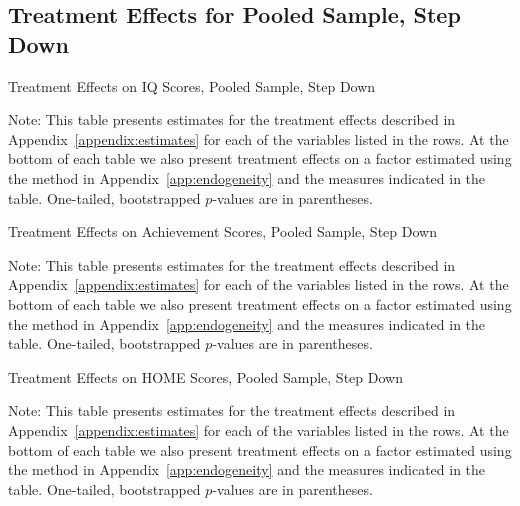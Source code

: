 \subsection{Treatment Effects for Pooled Sample, Step Down}


	\begin{table}[H]
     \caption{Treatment Effects on IQ Scores, Pooled Sample, Step Down}
     \label{table:abccare_rslt_pooled_cat0_sd}
	
	\end{table}
\begin{spacing}{1}
\begin{footnotesize}
\noindent Note: This table presents estimates for the treatment effects described in Appendix~\ref{appendix:estimates} for each of the variables listed in the rows. At the bottom of each table we also present treatment effects on a factor estimated using the method in Appendix~\ref{app:endogeneity} and the measures indicated in the table. One-tailed, bootstrapped $p$-values are in parentheses.
\end{footnotesize}
\end{spacing}

	\begin{table}[H]
     \caption{Treatment Effects on Achievement Scores, Pooled Sample, Step Down}
     \label{table:abccare_rslt_pooled_cat1_sd}
	
	\end{table} 
\begin{spacing}{1}
\begin{footnotesize}
\noindent Note: This table presents estimates for the treatment effects described in Appendix~\ref{appendix:estimates} for each of the variables listed in the rows. At the bottom of each table we also present treatment effects on a factor estimated using the method in Appendix~\ref{app:endogeneity} and the measures indicated in the table. One-tailed, bootstrapped $p$-values are in parentheses.
\end{footnotesize}
\end{spacing}

	\begin{table}[H]
     \caption{Treatment Effects on HOME Scores, Pooled Sample, Step Down}
     \label{table:abccare_rslt_pooled_cat2_sd}
	
	\end{table} 
\begin{spacing}{1}
\begin{footnotesize}
\noindent Note: This table presents estimates for the treatment effects described in Appendix~\ref{appendix:estimates} for each of the variables listed in the rows. At the bottom of each table we also present treatment effects on a factor estimated using the method in Appendix~\ref{app:endogeneity} and the measures indicated in the table. One-tailed, bootstrapped $p$-values are in parentheses.
\end{footnotesize}
\end{spacing}

